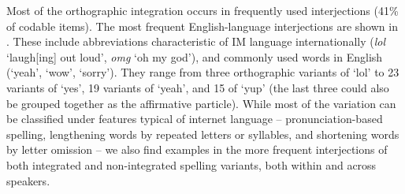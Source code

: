 \documentclass[output=paper]{langscibook}
\begin{document}
\begin{table}[p]
\small
  \caption{Orthographic integration of the most frequently used English-language interjections}
\label{tab:vihmanetal:4}
\end{table}


Most of the orthographic integration occurs in frequently used interjections (41\% of codable items). The most frequent English-language interjections are shown in . These include abbreviations characteristic of IM language internationally (\textit{lol} ‘laugh[ing] out loud’, \textit{omg} ‘oh my god’), and commonly used words in English (‘yeah’, ‘wow’, ‘sorry’). They range from three orthographic variants of ‘lol’ to 23 variants of ‘yes’, 19 variants of ‘yeah’, and 15 of ‘yup’ (the last three could also be grouped together as the affirmative particle). While most of the variation can be classified under features typical of internet language – pronunciation-based spelling, lengthening words by repeated letters or syllables, and shortening words by letter omission – we also find examples in the more frequent interjections of both integrated and non-integrated spelling variants, both within and across speakers.
\end{document}
